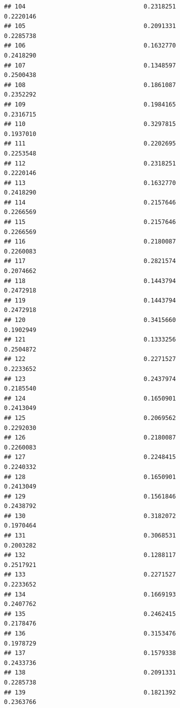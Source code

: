 \documentclass[
  american,
  man,floatsintext]{apa7}
\begin{document}
\begin{verbatim}
## 104                                 0.2318251               0.2220146
## 105                                 0.2091331               0.2285738
## 106                                 0.1632770               0.2418290
## 107                                 0.1348597               0.2500438
## 108                                 0.1861087               0.2352292
## 109                                 0.1984165               0.2316715
## 110                                 0.3297815               0.1937010
## 111                                 0.2202695               0.2253548
## 112                                 0.2318251               0.2220146
## 113                                 0.1632770               0.2418290
## 114                                 0.2157646               0.2266569
## 115                                 0.2157646               0.2266569
## 116                                 0.2180087               0.2260083
## 117                                 0.2821574               0.2074662
## 118                                 0.1443794               0.2472918
## 119                                 0.1443794               0.2472918
## 120                                 0.3415660               0.1902949
## 121                                 0.1333256               0.2504872
## 122                                 0.2271527               0.2233652
## 123                                 0.2437974               0.2185540
## 124                                 0.1650901               0.2413049
## 125                                 0.2069562               0.2292030
## 126                                 0.2180087               0.2260083
## 127                                 0.2248415               0.2240332
## 128                                 0.1650901               0.2413049
## 129                                 0.1561846               0.2438792
## 130                                 0.3182072               0.1970464
## 131                                 0.3068531               0.2003282
## 132                                 0.1288117               0.2517921
## 133                                 0.2271527               0.2233652
## 134                                 0.1669193               0.2407762
## 135                                 0.2462415               0.2178476
## 136                                 0.3153476               0.1978729
## 137                                 0.1579338               0.2433736
## 138                                 0.2091331               0.2285738
## 139                                 0.1821392               0.2363766

\end{verbatim}
\end{document}
